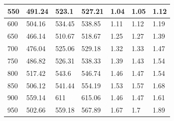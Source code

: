 \begin{table}[H]
\begin{tabular}{|l|l|l|l|l|l|l|}
550              & 491.24               & 523.1                & 527.21               & 1.04              & 1.05              & 1.12              \\ \hline
600              & 504.16               & 534.45               & 538.85               & 1.11              & 1.12              & 1.19              \\ \hline
650              & 466.14               & 510.67               & 518.67               & 1.25              & 1.27              & 1.39              \\ \hline
700              & 476.04               & 525.06               & 529.18               & 1.32              & 1.33              & 1.47              \\ \hline
750              & 486.82               & 526.31               & 538.33               & 1.39              & 1.43              & 1.54              \\ \hline
800              & 517.42               & 543.6                & 546.74               & 1.46              & 1.47              & 1.54              \\ \hline
850              & 506.12               & 541.44               & 554.19               & 1.53              & 1.57              & 1.68              \\ \hline
900              & 559.14               & 611                  & 615.06               & 1.46              & 1.47              & 1.61              \\ \hline
950              & 502.66               & 559.18               & 567.89               & 1.67              & 1.7               & 1.89              \\ \hline
\end{tabular}
\end{table}



